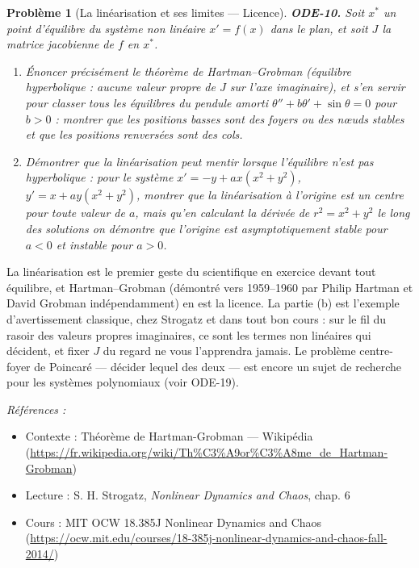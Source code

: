 \documentclass[11pt]{article}
\newtheorem{problem}{Problème}
\newenvironment{refs}{\par\small\noindent\emph{Références :}\begin{itemize}\setlength\itemsep{0pt}}{\end{itemize}\normalsize}
\begin{document}
\begin{problem}[{La linéarisation et ses limites --- Licence}]
\textbf{ODE-10.} Soit $ x^* $ un point d'équilibre du système non linéaire
$ x' = f(x) $ dans le plan, et soit $ J $ la matrice jacobienne de $ f $ en $ x^* $.
\begin{enumerate}
\item[(a)] Énoncer précisément le théorème de Hartman--Grobman (équilibre hyperbolique : aucune valeur
propre de $ J $ sur l'axe imaginaire), et s'en servir pour classer tous les équilibres du
pendule amorti $ \theta'' + b \theta' + \sin\theta = 0 $ pour $ b >0 $ : montrer que les
positions basses sont des foyers ou des n\oe{}uds stables et que les positions renversées sont des
cols.
\item[(b)] Démontrer que la linéarisation peut mentir lorsque l'équilibre n'est pas hyperbolique : pour
le système $ x' = -y + a x (x^2 + y^2) $, $ y' = x + a y (x^2 + y^2) $, montrer que la
linéarisation à l'origine est un centre pour toute valeur de $ a $, mais qu'en calculant la
dérivée de $ r^2 = x^2 + y^2 $ le long des solutions on démontre que l'origine est
asymptotiquement stable pour $ a <0 $ et instable pour $ a >0 $.
\end{enumerate}

\end{problem}

\noindent La linéarisation est le premier geste du scientifique en exercice devant tout
équilibre, et Hartman--Grobman (démontré vers 1959--1960 par Philip Hartman et David Grobman
indépendamment) en est la licence. La partie (b) est l'exemple d'avertissement classique, chez
Strogatz et dans tout bon cours : sur le fil du rasoir des valeurs propres imaginaires, ce sont
les termes non linéaires qui décident, et fixer $ J $ du regard ne vous l'apprendra jamais. Le
problème centre-foyer de Poincaré --- décider lequel des deux --- est encore un sujet de recherche
pour les systèmes polynomiaux (voir ODE-19).

\begin{refs}
\item Contexte : Théorème de Hartman-Grobman --- Wikipédia (\url{https://fr.wikipedia.org/wiki/Th%C3%A9or%C3%A8me_de_Hartman-Grobman})
\item Lecture : S. H. Strogatz, \textit{Nonlinear Dynamics and Chaos}, chap. 6
\item Cours : MIT OCW 18.385J Nonlinear Dynamics and Chaos (\url{https://ocw.mit.edu/courses/18-385j-nonlinear-dynamics-and-chaos-fall-2014/})
\end{refs}
\end{document}
